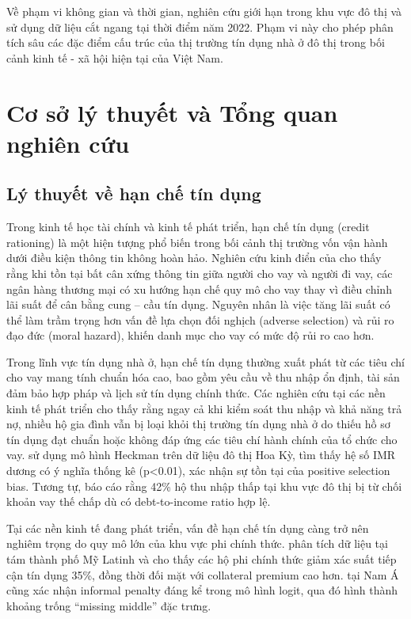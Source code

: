 \documentclass[12pt,a4paper]{report}
\begin{document}
	Về phạm vi không gian và thời gian, nghiên cứu giới hạn trong khu vực đô thị và sử dụng dữ liệu cắt ngang tại thời điểm năm 2022. Phạm vi này cho phép phân tích sâu các đặc điểm cấu trúc của thị trường tín dụng nhà ở đô thị trong bối cảnh kinh tế - xã hội hiện tại của Việt Nam.
		
	\chapter{Cơ sở lý thuyết và Tổng quan nghiên cứu}
	
	\section{Lý thuyết về hạn chế tín dụng}
	
	Trong kinh tế học tài chính và kinh tế phát triển, hạn chế tín dụng (credit rationing) là một hiện tượng phổ biến trong bối cảnh thị trường vốn vận hành dưới điều kiện thông tin không hoàn hảo. Nghiên cứu kinh điển của \textcite{Stiglitz1981} cho thấy rằng khi tồn tại bất cân xứng thông tin giữa người cho vay và người đi vay, các ngân hàng thương mại có xu hướng hạn chế quy mô cho vay thay vì điều chỉnh lãi suất để cân bằng cung -- cầu tín dụng. Nguyên nhân là việc tăng lãi suất có thể làm trầm trọng hơn vấn đề lựa chọn đối nghịch (adverse selection) và rủi ro đạo đức (moral hazard), khiến danh mục cho vay có mức độ rủi ro cao hơn.
	
	Trong lĩnh vực tín dụng nhà ở, hạn chế tín dụng thường xuất phát từ các tiêu chí cho vay mang tính chuẩn hóa cao, bao gồm yêu cầu về thu nhập ổn định, tài sản đảm bảo hợp pháp và lịch sử tín dụng chính thức. Các nghiên cứu tại các nền kinh tế phát triển cho thấy rằng ngay cả khi kiểm soát thu nhập và khả năng trả nợ, nhiều hộ gia đình vẫn bị loại khỏi thị trường tín dụng nhà ở do thiếu hồ sơ tín dụng đạt chuẩn hoặc không đáp ứng các tiêu chí hành chính của tổ chức cho vay. \textcite{lewisfaupel2024disparities} sử dụng mô hình Heckman trên dữ liệu đô thị Hoa Kỳ, tìm thấy hệ số IMR dương có ý nghĩa thống kê (p<0.01), xác nhận sự tồn tại của positive selection bias. Tương tự, \textcite{UrbanInstitute2024} báo cáo rằng 42\% hộ thu nhập thấp tại khu vực đô thị bị từ chối khoản vay thế chấp dù có debt-to-income ratio hợp lệ.
	
	Tại các nền kinh tế đang phát triển, vấn đề hạn chế tín dụng càng trở nên nghiêm trọng do quy mô lớn của khu vực phi chính thức. \textcite{arrieta2005Mortgage} phân tích dữ liệu tại tám thành phố Mỹ Latinh và cho thấy các hộ phi chính thức giảm xác suất tiếp cận tín dụng 35\%, đồng thời đối mặt với collateral premium cao hơn. \textcite{sharma2024saving} tại Nam Á cũng xác nhận informal penalty đáng kể trong mô hình logit, qua đó hình thành khoảng trống ``missing middle'' đặc trưng.
	
\end{document}
